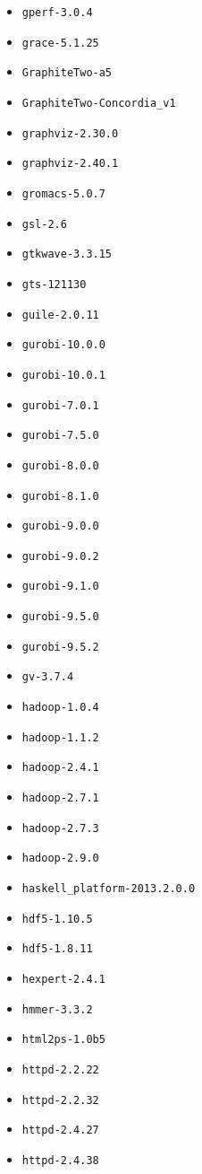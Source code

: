 \begin{itemize}
\item \verb|gperf-3.0.4|
\item \verb|grace-5.1.25|
\item \verb|GraphiteTwo-a5|
\item \verb|GraphiteTwo-Concordia_v1|
\item \verb|graphviz-2.30.0|
\item \verb|graphviz-2.40.1|
\item \verb|gromacs-5.0.7|
\item \verb|gsl-2.6|
\item \verb|gtkwave-3.3.15|
\item \verb|gts-121130|
\item \verb|guile-2.0.11|
\item \verb|gurobi-10.0.0|
\item \verb|gurobi-10.0.1|
\item \verb|gurobi-7.0.1|
\item \verb|gurobi-7.5.0|
\item \verb|gurobi-8.0.0|
\item \verb|gurobi-8.1.0|
\item \verb|gurobi-9.0.0|
\item \verb|gurobi-9.0.2|
\item \verb|gurobi-9.1.0|
\item \verb|gurobi-9.5.0|
\item \verb|gurobi-9.5.2|
\item \verb|gv-3.7.4|
\item \verb|hadoop-1.0.4|
\item \verb|hadoop-1.1.2|
\item \verb|hadoop-2.4.1|
\item \verb|hadoop-2.7.1|
\item \verb|hadoop-2.7.3|
\item \verb|hadoop-2.9.0|
\item \verb|haskell_platform-2013.2.0.0|
\item \verb|hdf5-1.10.5|
\item \verb|hdf5-1.8.11|
\item \verb|hexpert-2.4.1|
\item \verb|hmmer-3.3.2|
\item \verb|html2ps-1.0b5|
\item \verb|httpd-2.2.22|
\item \verb|httpd-2.2.32|
\item \verb|httpd-2.4.27|
\item \verb|httpd-2.4.38|

\end{itemize}
